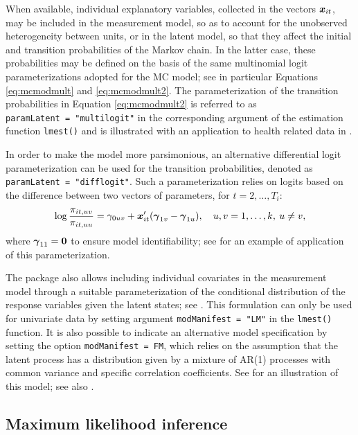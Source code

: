 When available, individual explanatory variables, collected in the
vectors \(\mbox{\boldmath $x$}_{it}\), may be included in the measurement model, so as to
account for the unobserved heterogeneity between units, or in the latent
model, so that they affect the initial and transition probabilities of
the Markov chain. In the latter case, these probabilities may be defined
on the basis of the same multinomial logit parameterizations adopted for
the MC model; see in particular Equations \eqref{eq:mcmodmult} and
\eqref{eq:mcmodmult2}. The parameterization of the transition
probabilities in Equation \eqref{eq:mcmodmult2} is referred to as
\texttt{paramLatent\ =\ "multilogit"} in the corresponding argument of the
estimation function \texttt{lmest()} and is illustrated with an application to
health related data in \cite{bart:pand:penn:17}.

In order to make the model more parsimonious, an alternative
differential logit parameterization can be used for the transition
probabilities, denoted as \texttt{paramLatent\ =\ "difflogit"}. Such a
parameterization relies on logits based on the difference between two
vectors of parameters, for \(t=2,\ldots,T_i\): \begin{equation}
\log\frac{\pi_{it,uv}} {\pi_{it,uu}} =
\gamma_{0uv} + \mbox{\boldmath $x$}_{it}^\prime (\mbox{\boldmath $\gamma$}_{1v}-\mbox{\boldmath $\gamma$}_{1u}),\quad u,v=1,\ldots,k, \: u\neq v,
\label{eq:hmtransd}
\end{equation} where \(\mbox{\boldmath $\gamma$}_{11}= \mbox{\boldmath $0$}\) to ensure model
identifiability; see \cite{bart:mont:pand:15} for an example of
application of this parameterization.

The  package also allows including individual covariates
in the measurement model through a suitable parameterization of the
conditional distribution of the response variables given the latent
states; see \cite{bart:pand:penn:17}. This formulation can only be used
for univariate data by setting argument \texttt{modManifest\ =\ "LM"} in the
\texttt{lmest()} function. It is also possible to indicate an alternative model
specification by setting the option \texttt{modManifest\ =\ FM}, which relies on
the assumption that the latent process has a distribution given by a
mixture of AR(1) processes with common variance and specific correlation
coefficients. See \cite{bart:bacc:penn:14} for an illustration of this
model; see also \cite{penn:vitt:13}.

\hypertarget{subsec:HMest}{%
\subsection{Maximum likelihood inference}\label{subsec:HMest}}

